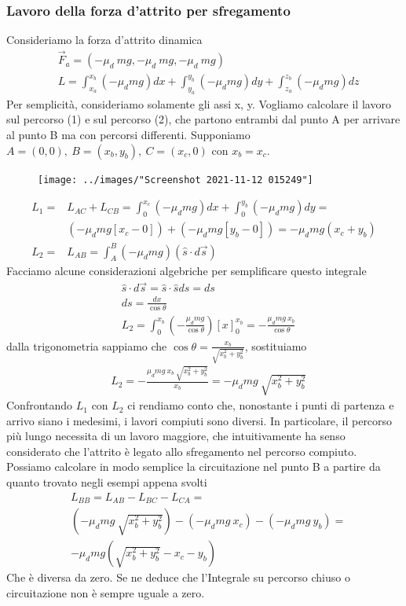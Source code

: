 \subsubsection{Lavoro della forza d'attrito per sfregamento}
Consideriamo la forza d'attrito dinamica 
\begin{align*}
	&\vec{F}_a = (-\mu_d\ mg,-\mu_d\ mg,-\mu_d\ mg)\\ 
	&L =  \int_{x_a}^{x_b}(-\mu_d mg) dx +\int_{y_a}^{y_b}(-\mu_d mg) dy+\int_{z_a}^{z_b}(-\mu_d mg) dz
\end{align*}
Per semplicità, consideriamo solamente gli assi x, y. Vogliamo calcolare il lavoro sul percorso (1) e sul percorso (2), che partono entrambi dal punto A per arrivare al punto B ma con percorsi differenti. Supponiamo $A = (0,0),\ B = (x_b,y_b),\ C= (x_c,0)$ con $x_b = x_c$.
\begin{figure}[h]
	\centering
	\texttt{[image: ../images/"Screenshot 2021-11-12 015249"]}
	\label{fig:screenshot-2021-11-12-015249}
\end{figure}\FloatBarrier
\begin{align*}
L_1 =& L_{AC}+L_{CB} = \int_{0}^{x_c} (-\mu_d mg) dx + \int_{0}^{y_b} (-\mu_d mg) dy=\\
&(-\mu_d mg [x_c-0])+(-\mu_d mg [y_b-0]) = -\mu_d mg(x_c+y_b)\\
L_2 =& L_{AB} = \int_{A}^{B}(-\mu_d mg) (\hat{s} \cdot d\vec{s}) 
\end{align*}
Facciamo alcune considerazioni algebriche per semplificare questo integrale
\begin{align*}
&\hat{s}\cdot d\vec{s}= \hat{s}\cdot \hat{s} ds = ds\\
& ds =\frac{dx}{\cos\theta}\\
&L_2 = \int_{0}^{x_b}(-\frac{\mu_d mg}{\cos\theta}) [x]_{0}^{x_b}=-\frac{\mu_d mg\ x_b}{\cos\theta}
\end{align*}
dalla trigonometria sappiamo che $\cos\theta= \frac{x_b}{\sqrt{x_b^2+y_b^2}}$, sostituiamo
\begin{align*}
&L_2 = -\frac{\mu_d mg\ x_b\ \sqrt{x_b^2+y_b^2}}{x_b} = -\mu_d mg\ \sqrt{x_b^2+y_b^2} 
\end{align*}
Confrontando $L_1$ con $L_2$ ci rendiamo conto che, nonostante i punti di partenza e arrivo siano i medesimi, i lavori compiuti sono diversi. In particolare, il percorso più lungo necessita di un lavoro maggiore, che intuitivamente ha senso considerato che l'attrito è legato allo sfregamento nel percorso compiuto. Possiamo calcolare in modo semplice la circuitazione nel punto B a partire da quanto trovato negli esempi appena svolti
\begin{align*}
&L_{BB} = L_{AB}-L_{BC}-L_{CA}=\\
&(-\mu_d mg\ \sqrt{x_b^2+y_b^2}) - (-\mu_d mg\ x_c) - (-\mu_d mg\ y_b)=\\
&-\mu_d mg(\sqrt{x_b^2+y_b^2}-x_c-y_b)
\end{align*}
Che è diversa da zero. Se ne deduce che l'Integrale su percorso chiuso o circuitazione non è sempre uguale a zero.

